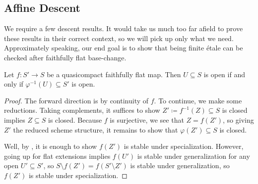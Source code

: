 \documentclass{amsart}
\begin{document}
\subsection{Affine Descent}
We require a few descent results. It would take us much too far afield to prove these results in their correct context, so we will pick up only what we need. Approximately speaking, our end goal is to show that being finite \'etale can be checked after faithfully flat base-change.
\begin{lemma} \label{lem:fpqc-quotient-top}
    Let $f\colon S'\to S$ be a quasicompact faithfully flat map. Then $U\subseteq S$ is open if and only if $\varphi^{-1}(U)\subseteq S'$ is open.
\end{lemma}
\begin{proof}
    The forward direction is by continuity of $f$. To continue, we make some reductions. Taking complements, it suffices to show $Z'\coloneqq f^{-1}(Z)\subseteq S$ is closed implies $Z\subseteq S$ is closed. Because $f$ is surjective, we see that $Z=f(Z')$, so giving $Z'$ the reduced scheme structure, it remains to show that $\varphi(Z')\subseteq S$ is closed.
    
    Well, by \cite[Lemma~II.4.5]{hartshorne}, it is enough to show $f(Z')$ is stable under specialization. However, going up for flat extensions \cite[Lemma~10.11]{eisenbud-comm-alg} implies $f(U')$ is stable under generalization for any open $U'\subseteq S'$, so $S\setminus f(Z')=f(S'\setminus Z')$ is stable under generalization, so $f(Z')$ is stable under specialization.
\end{proof}
\end{document}
